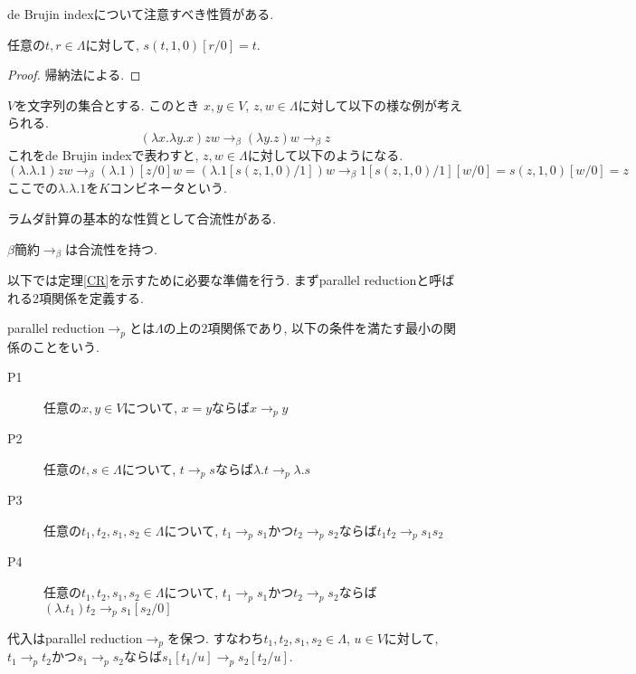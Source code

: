 \documentclass[12pt, titlepage]{ltjsarticle}
\begin{document}
de Brujin indexについて注意すべき性質がある.

\begin{lem}
 任意の$t, r \in \Lambda$に対して, $s (t, 1, 0)[r/0] = t$.
\end{lem}
\begin{proof}
 帰納法による.
\end{proof}

\begin{ex}[$K$ コンビネータ]
 $V$を文字列の集合とする. このとき $x, y \in V$, $z, w \in \Lambda$に対して以下の様な例が考えられる.
 \[
 (\lambda x. \lambda y. x) z w \rightarrow_{\beta} (\lambda y. z) w \rightarrow_{\beta} z
 \]
 これをde Brujin indexで表わすと, $z, w \in \Lambda$に対して以下のようになる.
 \[
 (\lambda. \lambda. 1) z w \rightarrow_{\beta} (\lambda. 1)[z/0] w = (\lambda. 1[s (z, 1, 0)/1]) w \rightarrow_{\beta} 1[s (z, 1, 0)/1][w/0] = s (z, 1, 0)[w/0] = z
 \]
ここでの$\lambda. \lambda. 1$を$K$コンビネータという.
\end{ex}

ラムダ計算の基本的な性質として合流性がある.

\begin{thm}\label{CR}
 $\beta$簡約$\rightarrow_{\beta}$は合流性を持つ.
\end{thm}

以下では定理\ref{CR}を示すために必要な準備を行う. まずparallel reductionと呼ばれる2項関係を定義する.

\begin{defn}
 parallel reduction$\rightarrow_{p}$とは$\Lambda$の上の$2$項関係であり, 以下の条件を満たす最小の関係のことをいう.
 \begin{description}
  \item[P1] 任意の$x, y \in V$について, $x = y$ならば$x \rightarrow_{p} y$
  \item[P2] 任意の$t, s \in \Lambda$について, $t \rightarrow_{p} s$ならば$\lambda. t \rightarrow_{p} \lambda. s$
  \item[P3] 任意の$t_1, t_2, s_1, s_2 \in \Lambda$について,
        $t_1 \rightarrow_{p} s_1$かつ$t_2 \rightarrow_{p} s_2$ならば$t_1 t_2 \rightarrow_{p} s_1 s_2$
  \item[P4] 任意の$t_1, t_2, s_1, s_2 \in \Lambda$について,
        $t_1 \rightarrow_{p} s_1$かつ$t_2 \rightarrow_{p} s_2$ならば$(\lambda. t_1) t_2 \rightarrow_{p} s_1[s_2/0]$
 \end{description}
\end{defn}

\begin{lem}\label{spp}
 代入はparallel reduction$\rightarrow_{p}$を保つ. すなわち$t_1, t_2, s_1, s_2 \in \Lambda$, $u \in V$に対して, $t_1 \rightarrow_{p} t_2$かつ$s_1 \rightarrow_{p} s_2$ならば$s_1[t_1/u] \rightarrow_{p} s_2[t_2/u]$.
\end{lem}
\end{document}
